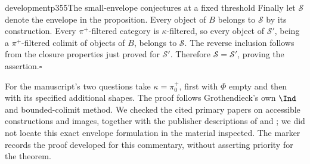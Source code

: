\begin{dcomment}{development}{p355}{The small-envelope conjectures at a fixed threshold}
Finally let $\mathcal S$ denote the envelope in the proposition. Every object of $B$ belongs to $\mathcal S$ by its construction. Every $\pi^+$-filtered category is $\kappa$-filtered, so every object of $\mathcal S'$, being a $\pi^+$-filtered colimit of objects of $B$, belongs to $\mathcal S$. The reverse inclusion follows from the closure properties just proved for $\mathcal S'$. Therefore $\mathcal S=\mathcal S'$, proving the assertion.\hfill$\square$

For the manuscript's two questions take $\kappa=\pi_0^+$, first with $\Phi$ empty and then with its specified additional shapes. The proof follows Grothendieck's own $\Ind$ and bounded-colimit method. We checked the cited primary papers on accessible constructions and images, together with the publisher descriptions of \citet{MakkaiPare1989} and \citet{AdamekRosicky1994}; we did not locate this exact envelope formulation in the material inspected. The marker records the proof developed for this commentary, without asserting priority for the theorem.
\end{dcomment}

